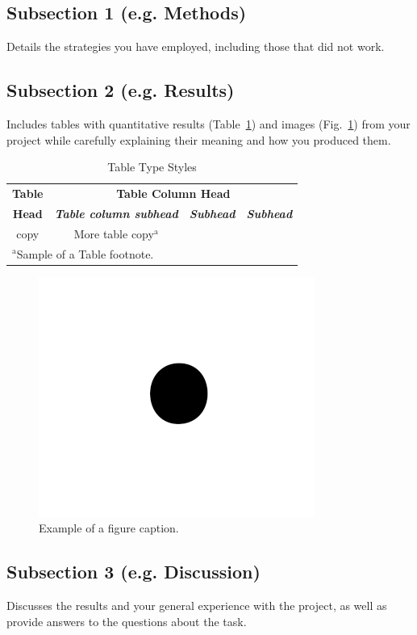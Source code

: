 \documentclass[conference]{IEEEtran}
\begin{document}
\subsection{Subsection 1 (e.g. Methods)}
 Details the strategies you have employed, including those that did not work.

\subsection{Subsection 2 (e.g. Results)}
Includes tables with quantitative results (Table~\ref{table:example}) and images (Fig.~\ref{fig:example}) from your project while carefully explaining their meaning and how you produced them.
\begin{table}[htbp]
\caption{Table Type Styles}
\begin{center}
\begin{tabular}{|c|c|c|c|}
\hline
\textbf{Table}&\multicolumn{3}{|c|}{\textbf{Table Column Head}} \\
\cline{2-4} 
\textbf{Head} & \textbf{\textit{Table column subhead}}& \textbf{\textit{Subhead}}& \textbf{\textit{Subhead}} \\
\hline
copy& More table copy$^{\mathrm{a}}$& &  \\
\hline
\multicolumn{4}{l}{$^{\mathrm{a}}$Sample of a Table footnote.}
\end{tabular}
\label{table:example}
\end{center}
\end{table}

\begin{figure}[htbp]
\centerline{\includegraphics{fig1.png}}
\caption{Example of a figure caption.}
\label{fig:example}
\end{figure}
\subsection{Subsection 3 (e.g. Discussion)}
Discusses the results and your general experience with the project, as well as provide answers to the questions about the task.
\end{document}
